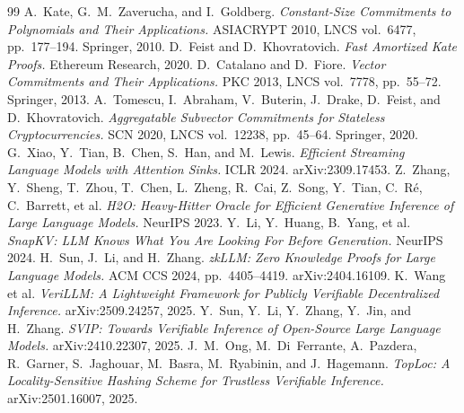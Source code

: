 \documentclass[version=submission]{iacrcc}
\theoremstyle{definition}
\begin{document}
\begin{thebibliography}{99}
 A.~Kate, G.~M.~Zaverucha, and I.~Goldberg.
  \emph{Constant-Size Commitments to Polynomials and Their Applications.}
  ASIACRYPT 2010, LNCS vol.~6477, pp.~177--194. Springer, 2010.
 D.~Feist and D.~Khovratovich.
  \emph{Fast Amortized Kate Proofs.} Ethereum Research, 2020.
 D.~Catalano and D.~Fiore.
  \emph{Vector Commitments and Their Applications.} PKC 2013, LNCS vol.~7778,
  pp.~55--72. Springer, 2013.
 A.~Tomescu, I.~Abraham, V.~Buterin, J.~Drake, D.~Feist, and
  D.~Khovratovich. \emph{Aggregatable Subvector Commitments for Stateless
  Cryptocurrencies.} SCN 2020, LNCS vol.~12238, pp.~45--64. Springer, 2020.
 G.~Xiao, Y.~Tian, B.~Chen, S.~Han, and M.~Lewis.
  \emph{Efficient Streaming Language Models with Attention Sinks.}
  ICLR 2024. arXiv:2309.17453.
 Z.~Zhang, Y.~Sheng, T.~Zhou, T.~Chen, L.~Zheng, R.~Cai, Z.~Song,
  Y.~Tian, C.~R\'e, C.~Barrett, et al.
  \emph{H2O: Heavy-Hitter Oracle for Efficient Generative Inference of Large
  Language Models.} NeurIPS 2023.
 Y.~Li, Y.~Huang, B.~Yang, et al.
  \emph{SnapKV: LLM Knows What You Are Looking For Before Generation.}
  NeurIPS 2024.
 H.~Sun, J.~Li, and H.~Zhang.
  \emph{zkLLM: Zero Knowledge Proofs for Large Language Models.}
  ACM CCS 2024, pp.~4405--4419. arXiv:2404.16109.
 K.~Wang et al.
  \emph{VeriLLM: A Lightweight Framework for Publicly Verifiable Decentralized
  Inference.} arXiv:2509.24257, 2025.
 Y.~Sun, Y.~Li, Y.~Zhang, Y.~Jin, and H.~Zhang.
  \emph{SVIP: Towards Verifiable Inference of Open-Source Large Language Models.}
  arXiv:2410.22307, 2025.
 J.~M.~Ong, M.~Di~Ferrante, A.~Pazdera, R.~Garner, S.~Jaghouar,
  M.~Basra, M.~Ryabinin, and J.~Hagemann.
  \emph{TopLoc: A Locality-Sensitive Hashing Scheme for Trustless Verifiable
  Inference.} arXiv:2501.16007, 2025.
\end{thebibliography}
\end{document}

